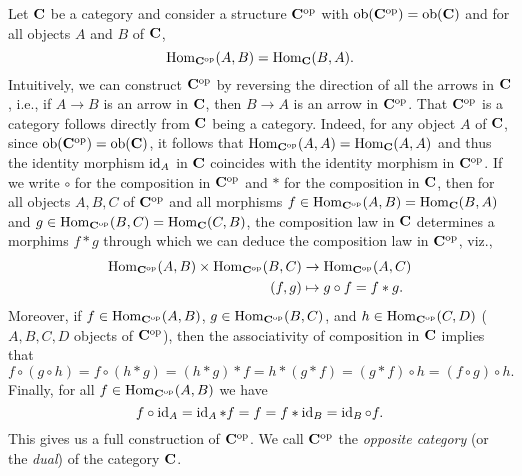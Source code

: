 \begin{example}
    \label{ex:opposite-category}
    Let \(\mathbf{C}\) be a category and consider a structure \(\mathbf{C}^{\mathrm{op}}\)
    with \(\operatorname{ob}(\mathbf{\mathbf{C}^{\mathrm{op}}}) = \operatorname{ob}(\mathbf{\mathbf{C}})\) and for all objects \(A\) and
    \(B\) of \(\mathbf{C}\),
    \[
        \operatorname{Hom}_{\mathbf{C}^{\mathrm{op}}}(A, B) = \operatorname{Hom}_{\mathbf{C}}(B, A).
    \]
    Intuitively, we can construct \(\mathbf{C}^{\mathrm{op}}\) by reversing the direction of
    all the arrows in \(\mathbf{C}\), i.e., if \(A \to B\) is an arrow in
    \(\mathbf{C}\), then \(B \to A\) is an arrow in \(\mathbf{C}^{\mathrm{op}}\). That
    \(\mathbf{C}^{\mathrm{op}}\) is a category follows directly from \(\mathbf{C}\) being a
    category. Indeed, for any object \(A\) of \(\mathbf{C}\), since
    \(\operatorname{ob}(\mathbf{\mathbf{C}^{\mathrm{op}}}) = \operatorname{ob}(\mathbf{\mathbf{C}})\), it follows that
    \(\operatorname{Hom}_{\mathbf{C}^{\mathrm{op}}}(A, A) = \operatorname{Hom}_{\mathbf{C}}(A, A)\) and thus the identity
    morphism \(\operatorname{id}_A\) in \(\mathbf{C}\) coincides with the identity morphism in
    \(\mathbf{C}^{\mathrm{op}}\). If we write \(\circ\) for the composition in
    \(\mathbf{C}^{\mathrm{op}}\) and \(*\) for the composition in \(\mathbf{C}\), then for all
    objects \(A, B, C\) of \(\mathbf{C}^{\mathrm{op}}\) and all morphisms \(f \in
    \operatorname{Hom}_{\mathbf{C}^{\mathrm{op}}}(A, B) = \operatorname{Hom}_{\mathbf{C}}(B,A)\) and \(g \in
    \operatorname{Hom}_{\mathbf{C}^{\mathrm{op}}}(B, C) = \operatorname{Hom}_{\mathbf{C}}(C, B)\), the composition law in
    \(\mathbf{C}\) determines a morphims \(f * g\) through which we can deduce the
    composition law in \(\mathbf{C}^{\mathrm{op}}\), viz.,
    \begin{align*}
        \operatorname{Hom}_{\mathbf{C}^{\mathrm{op}}}(A, B) \times \operatorname{Hom}_{\mathbf{C}^{\mathrm{op}}}(B, C) &\to \operatorname{Hom}_{\mathbf{C}^{\mathrm{op}}}(A, C)\\
        (f, g) &\mapsto g \circ f = f * g.
    \end{align*}
    Moreover, if \(f \in \operatorname{Hom}_{\mathbf{C}^{\mathrm{op}}}(A, B)\), \(g \in
    \operatorname{Hom}_{\mathbf{C}^{\mathrm{op}}}(B, C)\), and \(h \in \operatorname{Hom}_{\mathbf{C}^{\mathrm{op}}}(C, D)\) (\(A,
    B, C, D\) objects of \(\mathbf{C}^{\mathrm{op}}\)), then the associativity of
    composition in \(\mathbf{C}\) implies that
    \[ 
        f \circ (g \circ h) = f \circ (h * g) = (h * g) * f = h * (g * f) = (g * f) \circ h = (f \circ g) \circ h.
    \]
    Finally, for all \(f \in \operatorname{Hom}_{\mathbf{C}^{\mathrm{op}}}(A, B)\) we have
    \[
        f \circ \operatorname{id}_A = \operatorname{id}_A * f = f = f * \operatorname{id}_B = \operatorname{id}_B \circ f.
    \]
    This gives us a full construction of \(\mathbf{C}^{\mathrm{op}}\). We call
    \(\mathbf{C}^{\mathrm{op}}\) the \emph{opposite category} (or the \emph{dual}) of the
    category \(\mathbf{C}\).
\end{example}


\bigskip

